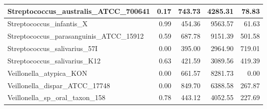 \documentclass[12pt,a4paper]{article}
\begin{document}
\begin{table}[ht]
\begin{center}
\begin{tabular}{|l*{4}{|r}|}
Streptococcus\_australis\_ATCC\_700641 & 0.17 & 743.73 & 4285.31 & 78.83 \\ \hline
Streptococcus\_infantis\_X & 0.99 & 454.36 & 9563.57 & 61.63 \\ \hline
Streptococcus\_parasanguinis\_ATCC\_15912 & 0.59 & 687.78 & 9151.39 & 501.58 \\ \hline
Streptococcus\_salivarius\_57I & 0.00 & 395.00 & 2964.90 & 719.01 \\ \hline
Streptococcus\_salivarius\_K12 & 0.63 & 421.59 & 3089.56 & 419.39 \\ \hline
Veillonella\_atypica\_KON & 0.00 & 661.57 & 8281.73 & 0.00 \\ \hline
Veillonella\_dispar\_ATCC\_17748 & 0.00 & 849.70 & 6388.58 & 267.87 \\ \hline
Veillonella\_sp\_oral\_taxon\_158 & 0.78 & 443.12 & 4052.55 & 227.69 \\ \hline
\end{tabular}
\end{center}
\end{table}
\end{document}
